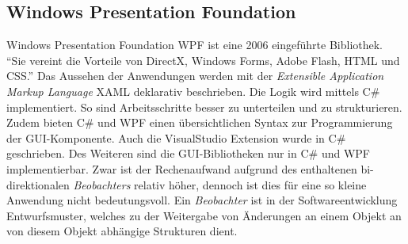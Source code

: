 \subsection{Windows Presentation Foundation}
\label{wpf}

Windows Presentation Foundation \ac{WPF} ist eine 2006 eingeführte Bibliothek. \cite{wikipedia_wpf} "`Sie vereint die Vorteile von DirectX, Windows Forms, Adobe Flash, HTML und CSS."'\cite{eiwpf} 
Das Aussehen der Anwendungen werden mit der \textit{Extensible Application Markup Language} \ac{XAML} deklarativ beschrieben. Die Logik wird mittels C\# implementiert. So sind Arbeitsschritte besser zu unterteilen und zu strukturieren. Zudem bieten C\# und WPF einen übersichtlichen Syntax zur Programmierung der GUI-Komponente. 
Auch die VisualStudio Extension wurde in C\# geschrieben.
Des Weiteren sind die GUI-Bibliotheken nur in C\# und WPF implementierbar. Zwar ist der Rechenaufwand aufgrund des enthaltenen bi-direktionalen \textit{Beobachters} relativ höher, dennoch ist dies für eine so kleine Anwendung nicht bedeutungsvoll. Ein \textit{Beobachter} ist in der Softwareentwicklung Entwurfsmuster, welches zu der Weitergabe von Änderungen an einem Objekt an von diesem Objekt abhängige Strukturen dient.